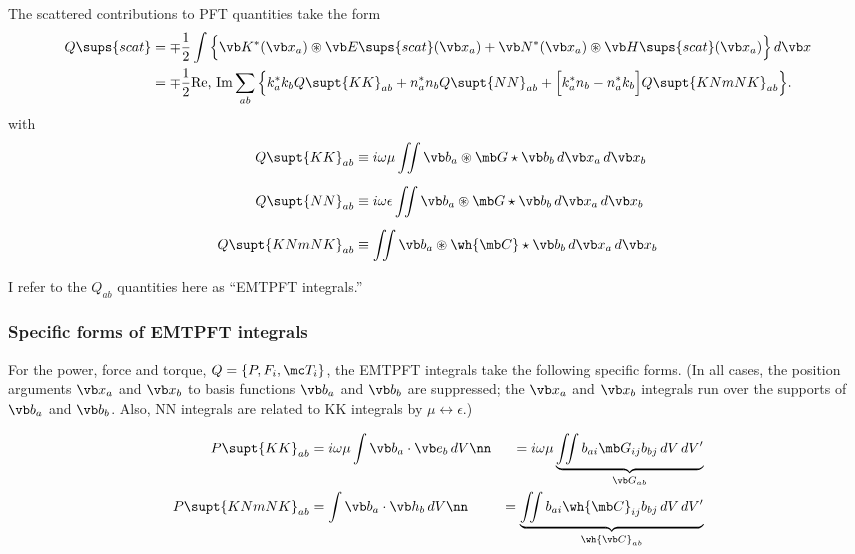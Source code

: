 The scattered contributions to PFT quantities take the form
\begin{align*}
Q\sups{scat}
&= \mp\frac{1}{2}
   \int\Big\{
    \vb K^*(\vb x_a) \circledast \vb E\sups{scat}(\vb x_a)
  + \vb N^*(\vb x_a) \circledast \vb H\sups{scat}(\vb x_a)
      \Big\} \, d\vb x
\\
&=\mp \frac{1}{2}\text{Re, Im}
  \sum_{ab} \Big\{  k_a^* k_b Q\supt{KK}_{ab}
                   + n_a^* n_b Q\supt{NN}_{ab}
                   +\Big[k_a^* n_b - n_a^* k_b\Big] Q\supt{KNmNK}_{ab}
            \Big\}.
\end{align*}
with
\begin{subequations}
\begin{align}
Q\supt{KK}_{ab} 
 &\equiv i\omega \mu \iint \vb b_a \circledast \mb G \star \vb b_b \, d\vb x_a \, d\vb x_b
\\[5pt]
Q\supt{NN}_{ab} 
 &\equiv i\omega \epsilon \iint \vb b_a \circledast \mb G \star \vb b_b \, d\vb x_a \, d\vb x_b
\\[5pt]
Q\supt{KNmNK}_{ab} 
 &\equiv \iint \vb b_a \circledast \wh{\mb C} \star \vb b_b \, d\vb x_a \, d\vb x_b
\\[5pt]
\end{align}
\label{QDef}
\end{subequations}
I refer to the $Q_{ab}$ quantities here as ``EMTPFT integrals.''

\subsubsection{Specific forms of EMTPFT integrals}
For the power, force and torque, $Q=\{P, F_i, \mc T_i\}$,
the EMTPFT integrals take the following specific forms.
(In all cases, the position arguments $\vb x_a$ and $\vb x_b$
to basis functions $\vb b_a$ and $\vb b_b$ are suppressed;
the $\vb x_a$ and $\vb x_b$ integrals run over the
supports of $\vb b_a$ and $\vb b_b$.
Also, NN integrals are related to KK integrals by 
$\mu \leftrightarrow \epsilon.$)

\begin{subequations}
\begin{align}
 P\supt{KK}_{ab}
&=i\omega \mu \int \vb b_a \cdot \vb e_b \, dV 
\nn
&=i\omega \mu 
  \underbrace{\iint b_{ai} \mb G_{ij} b_{bj} \, dV \, dV^\prime}_{\vb G_{ab}}
\\
 P\supt{KNmNK}_{ab}
&=\int \vb b_a \cdot \vb h_b \, dV 
\nn
&=\underbrace{\iint b_{ai} \wh{\mb C}_{ij} b_{bj} \, dV \, dV^\prime}
            _{\wh{\vb C}_{ab}}
\end{align}
\label{PIntegrals}
\end{subequations}

